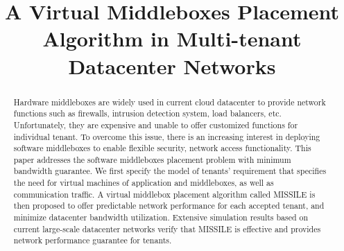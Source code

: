 \documentclass[10pt, conference, letterpaper]{IEEEtran}
\begin{document}
%
\title{A Virtual Middleboxes Placement Algorithm in Multi-tenant Datacenter Networks}

\author{
\and
{}
\and
{}
}


\maketitle


\begin{abstract}
Hardware middleboxes are widely used in current cloud datacenter to provide network functions such as firewalls, intrusion detection system, load balancers, etc. Unfortunately, they are expensive and unable to offer customized functions for individual tenant. To overcome this issue, there is an increasing interest in deploying software middleboxes to enable flexible security, network access functionality. This paper addresses the software middleboxes placement problem with minimum bandwidth guarantee. We first specify the model of tenants' requirement that specifies the need for virtual machines of application and middleboxes, as well as communication traffic. A virtual middlebox placement algorithm called MISSILE is then proposed to offer predictable network performance for each accepted tenant, and minimize  datacenter bandwidth utilization. Extensive simulation results based on current large-scale datacenter networks verify that MISSILE is effective and provides network performance guarantee for tenants. 
\end{abstract}

\IEEEpeerreviewmaketitle
\end{document}

